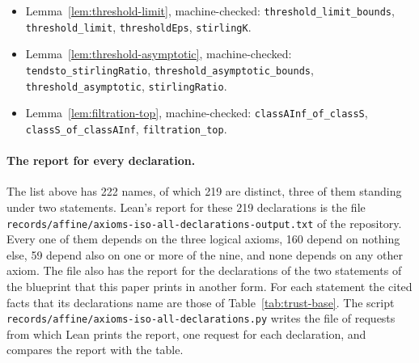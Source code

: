 {\begin{itemize}
\item Lemma~\ref{lem:threshold-limit}, machine-checked:
  \texttt{threshold\_limit\_bounds}, \texttt{threshold\_limit}, \texttt{thresholdEps}, \texttt{stirlingK}.
\item Lemma~\ref{lem:threshold-asymptotic}, machine-checked:
  \texttt{tendsto\_stirlingRatio}, \texttt{threshold\_asymptotic\_bounds}, \texttt{threshold\_asymptotic}, \texttt{stirlingRatio}.
\item Lemma~\ref{lem:filtration-top}, machine-checked:
  \texttt{classAInf\_of\_classS}, \texttt{classS\_of\_classAInf}, \texttt{filtration\_top}.
\end{itemize}
}


\paragraph{The report for every declaration.} The list above has 222 names, of which
219 are distinct, three of them standing under two statements. Lean's report for these
219 declarations is the file
\nolinkurl{records/affine/axioms-iso-all-declarations-output.txt} of the repository. Every one
of them depends on the three logical axioms, 160 depend on nothing else, 59 depend also
on one or more of the nine, and none depends on any other axiom. The file also has the report
for the declarations of the two statements of the blueprint that this paper prints in another
form. For each statement the cited facts that its declarations name are those of
Table~\ref{tab:trust-base}. The script
\nolinkurl{records/affine/axioms-iso-all-declarations.py} writes the file of requests from which
Lean prints the report, one request for each declaration, and compares the report with the
table.

